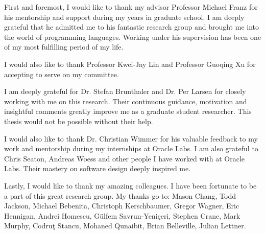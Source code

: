 \acknowledgments
{
  First and foremost, I would like to thank my advisor Professor Michael Franz for his mentorship and support during my years in graduate school.
  I am deeply grateful that he admitted me to his fantastic research group and brought me into the world of programming languages.
  Working under his supervision has been one of my most fulfilling period of my life.

  I would also like to thank Professor Kwei-Jay Lin and Professor Guoqing Xu for accepting to serve on my committee.

  I am deeply grateful for Dr. Stefan Brunthaler and Dr. Per Larsen for closely working with me on this research.
  Their continuous guidance, motivation and insightful comments greatly improve me as a graduate student researcher.
  This thesis would not be possible without their help.

  I would also like to thank Dr. Christian Wimmer for his valuable feedback to my work and mentorship during my internships at Oracle Labs.
  I am also grateful to Chris Seaton, Andreas Woess and other people I have worked with at Oracle Labs.
  Their mastery on software design deeply inspired me.

  Lastly, I would like to thank my amazing colleagues.
  I have been fortunate to be a part of this great research group.
  My thanks go to: Mason Chang, Todd Jackson, Michael Bebenita, Christoph Kerschbaumer, Gregor Wagner, Eric Hennigan, 
  Andrei Homescu, G{\"u}lfem Savrun-Yeniçeri, Stephen Crane, Mark Murphy, Codru\c{t} Stancu, Mohaned Qunaibit, Brian Belleville, Julian Lettner.
}


\newcommand{\mypubentry}[3]{
  \begin{tabular*}{1\textwidth}{@{\extracolsep{\fill}}p{4.5in}r}
    \textbf{#1} & \textbf{#2} \\
    \multicolumn{2}{@{\extracolsep{\fill}}p{.95\textwidth}}{#3}\vspace{6pt} \\
  \end{tabular*}
}
\newcommand{\mysoftentry}[3]{
  \begin{tabular*}{1\textwidth}{@{\extracolsep{\fill}}lr}
    \textbf{#1} & \url{#2} \\
    \multicolumn{2}{@{\extracolsep{\fill}}p{.95\textwidth}}
    {\emph{#3}}\vspace{-6pt} \\
  \end{tabular*}
}

